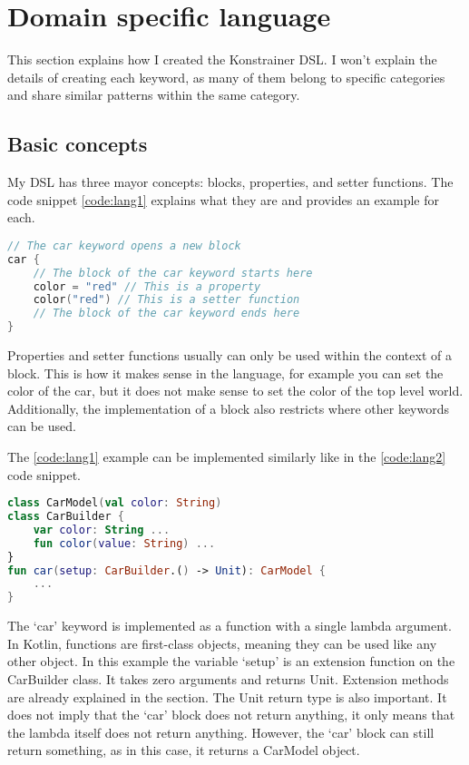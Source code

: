 \section{Domain specific language}
\label{sec:dsl}

This section explains how I created the Konstrainer DSL. I won't explain the details of creating each keyword, as many of them belong to specific categories and share similar patterns within the same category.

\subsection{Basic concepts}

My DSL has three mayor concepts: blocks, properties, and setter functions. The code snippet \ref{code:lang1} explains what they are and provides an example for each.

\begin{lstlisting}[caption={Language concepts},language=Kotlin,label=code:lang1]
// The car keyword opens a new block
car { 
    // The block of the car keyword starts here
    color = "red" // This is a property
    color("red") // This is a setter function
    // The block of the car keyword ends here
}
\end{lstlisting}

Properties and setter functions usually can only be used within the context of a block. This is how it makes sense in the language, for example you can set the color of the car, but it does not make sense to set the color of the top level world. Additionally, the implementation of a block also restricts where other keywords can be used.

The \ref{code:lang1} example can be implemented similarly like in the \ref{code:lang2} code snippet.

\begin{lstlisting}[caption={Basic idea behind a block},language=Kotlin,label=code:lang2]
class CarModel(val color: String)
class CarBuilder {
    var color: String ...
    fun color(value: String) ...
}
fun car(setup: CarBuilder.() -> Unit): CarModel {
    ...
}
\end{lstlisting}

The `car' keyword is implemented as a function with a single lambda argument. In Kotlin, functions are first-class objects, meaning they can be used like any other object. In this example the variable `setup' is an extension function on the CarBuilder class. It takes zero arguments and returns Unit. Extension methods are already explained in the  section. The Unit return type is also important. It does not imply that the `car' block does not return anything, it only means that the lambda itself does not return anything. However, the `car' block can still return something, as in this case, it returns a CarModel object.

